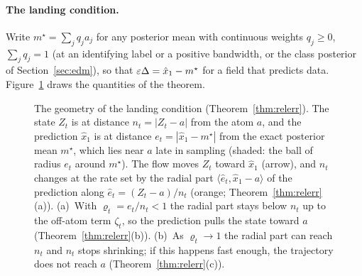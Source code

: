 \documentclass{article} %
\theoremstyle{plain}
\theoremstyle{definition}
\theoremstyle{remark}
\begin{document}
\paragraph{The landing condition.} Write $m^\star=\sum_jq_ja_j$ for any posterior mean with
continuous weights $q_j\ge0$, $\sum_jq_j=1$ (at an identifying label or a positive bandwidth, or the
class posterior of Section~\ref{sec:edm}), so that $\varepsilon\Delta=\hat x_1-m^\star$ for a field that
predicts data. Figure~\ref{fig:landing-geometry} draws the quantities of the theorem.

\begin{figure}[t]
\centering

\caption{The geometry of the landing condition (Theorem~\ref{thm:relerr}). The state $Z_t$ is at
distance $n_t=|Z_t-a|$ from the atom $a$, and the prediction $\hat x_1$ is at distance
$e_t=|\hat x_1-m^\star|$ from the exact posterior mean $m^\star$, which lies near $a$ late in
sampling (shaded: the ball of radius $e_t$ around $m^\star$). The flow moves $Z_t$ toward $\hat x_1$
(arrow), and $n_t$ changes at the rate set by the radial part $\langle\hat e_t,\hat x_1-a\rangle$ of
the prediction along $\hat e_t=(Z_t-a)/n_t$ (orange; Theorem~\ref{thm:relerr}(a)). (a)~With
$\varrho_t=e_t/n_t<1$ the radial part stays below $n_t$ up to the off-atom term $\zeta_t$, so the
prediction pulls the state toward $a$ (Theorem~\ref{thm:relerr}(b)). (b)~As $\varrho_t\to1$ the
radial part can reach $n_t$ and $n_t$ stops shrinking; if this happens fast enough, the trajectory
does not reach $a$ (Theorem~\ref{thm:relerr}(c)).}
\label{fig:landing-geometry}
\end{figure}
\end{document}
